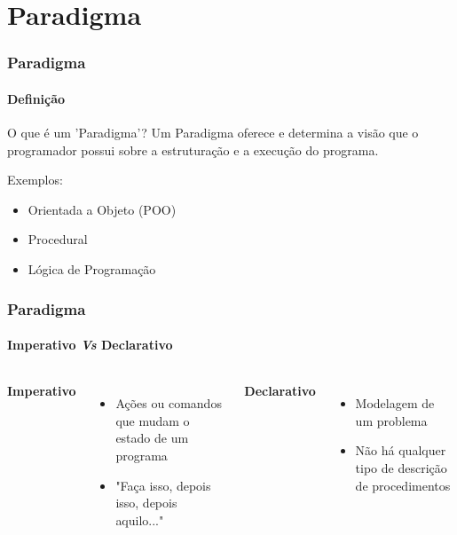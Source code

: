 \documentclass[aspectratio=169]{beamer}
\begin{document}
    \section{Paradigma}

    \begin{frame}

      \frametitle{Paradigma}
      \framesubtitle{Definição}

      \begin{block}{O que é um 'Paradigma'?}
        Um Paradigma oferece e determina a visão que o programador possui sobre a estruturação
        e a execução do programa.
       \end{block} \pause 

       Exemplos:

       \begin{itemize}
         \item Orientada a Objeto (POO)
         \item Procedural
         \item Lógica de Programação
       \end{itemize}

    \end{frame}

    \begin{frame}
      \frametitle{Paradigma}
      \framesubtitle{Imperativo \emph{Vs} Declarativo}

      \pause

      \begin{columns}
        \textbf{Imperativo} 

        \begin{itemize}
          \item Ações ou comandos que mudam o estado de um programa 
          \item "Faça isso, depois isso, depois aquilo..." \pause
        \end{itemize}


        \textbf{Declarativo} 
        \begin{itemize}
          \item Modelagem de um problema 
          \item Não há qualquer tipo de descrição de procedimentos
        \end{itemize}

      \end{columns}
    \end{frame}
\end{document}
